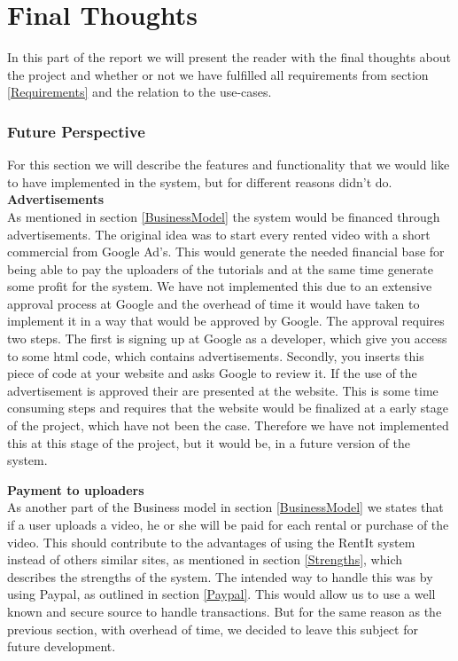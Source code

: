 \part{Final Thoughts}
In this part of the report we will present the reader with the final thoughts about the project and whether or not we have fulfilled all requirements from section \ref{Requirements} and the relation to the use-cases.

\section{Future Perspective}
For this section we will describe the features and functionality that we would like to have implemented in the system, but for different reasons didn't do.\\


\textbf{Advertisements}\\

As mentioned in section \ref{BusinessModel} the system would be financed through advertisements. The original idea was to start every rented video with a short commercial from Google Ad's. This would generate the needed financial base for being able to pay the uploaders of the tutorials and at the same time generate some profit for the system. We have not implemented this due to an extensive approval process at Google and the overhead of time it would have taken to implement it in a way that would be approved by Google. The approval requires two steps. The first is signing up at Google as a developer, which give you access to some html code, which contains advertisements. Secondly, you inserts this piece of code at your website and asks Google to review it. If the use of the advertisement is approved their are presented at the website.  This is some time consuming steps and requires that the website would be finalized at a early stage of the project, which have not been the case. Therefore we have not implemented this at this stage of the project, but it would be, in a future version of the system. 

\textbf{Payment to uploaders}\\

As another part of the Business model in section \ref{BusinessModel} we states that if a user uploads a video, he or she will be paid for each rental or purchase of the video. This should contribute to the advantages of using the RentIt system instead of others similar sites, as mentioned in section \ref{Strengths}, which describes the strengths of the system. The intended way to handle this was by using Paypal, as outlined in section \ref{Paypal}. This would allow us to use a well known and secure source to handle transactions. But for the same reason as the previous section, with overhead of time, we decided to leave this subject for future development.

